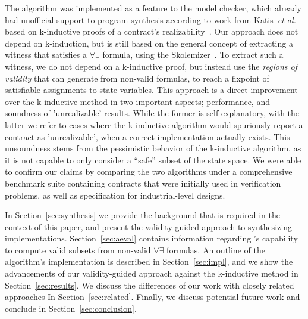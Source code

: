 The algorithm was implemented as a feature to the \jkind model checker, which
already had unofficial support to program synthesis according to work from
Katis~\textit{et al.} based on k-inductive proofs of a contract's
realizability~\cite{gacek2015towards,katis2016towards,katis2016synthesis}.
Our approach does not depend on k-induction, but is still based on the general
concept of extracting a witness that satisfies a $\forall\exists$ formula, using
the \aeval Skolemizer~\cite{fedyukovich2015automated}. To extract such a witness, we do not depend on a k-inductive proof, but instead use the \textit{regions of validity} that \aeval can generate from non-valid formulas,
to reach a fixpoint of satisfiable assignments to state variables.
This approach is a direct improvement over the k-inductive method in two
important aspects; performance, and soundness of 'unrealizable' results. While
the former is self-explanatory, with the latter we refer to cases where the
k-inductive algorithm would spuriously report a contract as 'unrealizable', when a correct
implementation actually exists. This unsoundness stems from the pessimistic
behavior of the k-inductive algorithm, as it is not capable to only consider a
``safe'' subset of the state space. We were able to confirm our claims
by comparing the two algorithms under a comprehensive benchmark suite containing
contracts that were initially used in verification problems, as well as
specification for industrial-level designs.

In Section~\ref{sec:synthesis} we provide the background that is required in the
context of this paper, and present the validity-guided approach to synthesizing
implementations. Section~\ref{sec:aeval} contains information regarding \aeval's
capability to compute valid subsets from non-valid $\forall\exists$ formulas.
An outline of the algorithm's implementation is described
in Section~\ref{sec:impl}, and we show the advancements of our validity-guided
approach against the k-inductive method in Section~\ref{sec:results}.
We discuss the differences of our work with closely related approaches In
Section~\ref{sec:related}. Finally, we discuss potential future work and
conclude in Section~\ref{sec:conclusion}.

